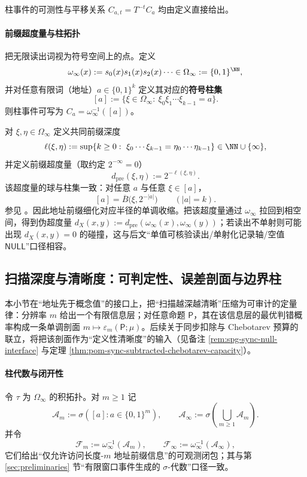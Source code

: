 柱事件的可测性与平移关系 $C_{a,t}=T^{-t}C_a$ 均由定义直接给出。



\paragraph{前缀超度量与柱拓扑}\label{par:spg-prefix-ultrametric}
把无限读出词视为符号空间上的点。定义
\[
\omega_\infty(x):=s_0(x)s_1(x)s_2(x)\cdots\in\Omega_\infty:=\{0,1\}^{\NN},
\]
并对任意有限词（地址）$a\in\{0,1\}^k$ 定义其对应的\textbf{符号柱集}
\[
[a]:=\{\xi\in\Omega_\infty:\ \xi_0\xi_1\cdots\xi_{k-1}=a\}.
\]
则柱事件可写为 $C_a=\omega_\infty^{-1}([a])$。
\par
对 $\xi,\eta\in\Omega_\infty$ 定义共同前缀深度
\[
\ell(\xi,\eta):=\sup\{k\ge 0:\ \xi_0\cdots\xi_{k-1}=\eta_0\cdots\eta_{k-1}\}\in\NN\cup\{\infty\},
\]
并定义前缀超度量（取约定 $2^{-\infty}=0$）
\[
d_{\mathrm{pre}}(\xi,\eta):=2^{-\ell(\xi,\eta)}.
\]
该超度量的球与柱集一致：对任意 $a$ 与任意 $\xi\in[a]$，
\[
[a]=\overline{B}\bigl(\xi,2^{-|a|}\bigr)\qquad(|a|=k).
\]
参见 \cite{LindMarcus1995}。因此地址前缀细化对应半径的单调收缩。把该超度量通过 $\omega_\infty$ 拉回到相空间，得到伪超度量 $d_X(x,y):=d_{\mathrm{pre}}(\omega_\infty(x),\omega_\infty(y))$；若读出不单射则可能出现 $d_X(x,y)=0$ 的碰撞，这与后文“单值可核验读出/单射化记录轴/空值 $\mathsf{NULL}$”口径相容。

\subsection{扫描深度与清晰度：可判定性、误差剖面与边界柱}\label{subsec:spg-scan-clarity}
本小节在“地址先于概念值”的接口上，把“扫描越深越清晰”压缩为可审计的定量律：分辨率 $m$ 给出一个有限信息层；对任意命题 $\mathsf P$，其在该信息层的最优判错概率构成一条单调剖面 $m\mapsto \varepsilon_m(\mathsf P;\mu)$。后续关于同步扣除与 Chebotarev 预算的联立，将把该剖面作为“定义性清晰度”的输入（见备注 \ref{rem:spg-sync-null-interface} 与定理 \ref{thm:pom-sync-subtracted-chebotarev-capacity}）。

\paragraph{柱代数与闭开性}
令 $\tau$ 为 $\Omega_\infty$ 的积拓扑。对 $m\ge 1$ 记
\[
\mathcal{A}_m:=\sigma([a]:a\in\{0,1\}^m),
\qquad
\mathcal{A}_\infty:=\sigma\!\left(\bigcup_{m\ge 1}\mathcal{A}_m\right).
\]
并令
\[
\mathcal{F}_m:=\omega_\infty^{-1}(\mathcal{A}_m),
\qquad
\mathcal{F}_\infty:=\omega_\infty^{-1}(\mathcal{A}_\infty),
\]
它们给出“仅允许访问长度-$m$ 地址前缀信息”的可观测闭包；其与第 \ref{sec:preliminaries} 节“有限窗口事件生成的 $\sigma$-代数”口径一致。

